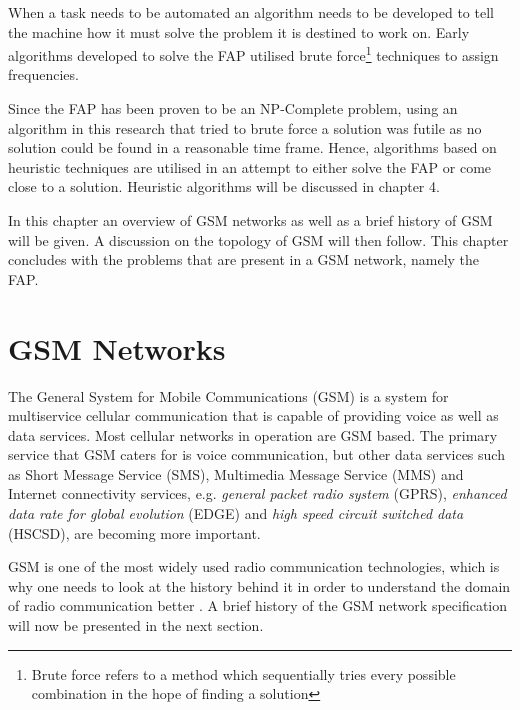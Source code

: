 When a task needs to be automated an algorithm needs to be developed to tell the machine how it must solve the problem it is destined to work on\cite{Karen2004,Eisenblatter,GSMArchitectureProtocolsServices,GSM92,wirelesstelcoMullet}. Early algorithms developed to solve the FAP utilised brute force\footnote{Brute force refers to a method which sequentially tries every possible combination in the hope of finding a solution} techniques to assign frequencies\cite{Karen2004,Eisenblatter,GSMArchitectureProtocolsServices,GSM92,wirelesstelcoMullet}.

Since the FAP has been proven to be an NP-Complete problem, using an algorithm in this research that tried to brute force a solution was futile as no solution could be found in a reasonable time frame. Hence, algorithms based on heuristic techniques are utilised in an attempt to either solve the FAP or come close to a solution. Heuristic algorithms will be discussed in chapter 4.

In this chapter an overview of GSM networks as well as a brief history of GSM will be given. A discussion on the topology of GSM will then follow. This chapter concludes with the problems that are present in a GSM network, namely the FAP.

\section{GSM Networks}
The General System for Mobile Communications (GSM) is a system for multiservice cellular communication that is capable of providing voice as well as data services\cite{Karen2004,Eisenblatter,GSMArchitectureProtocolsServices,GSM92,wirelesstelcoMullet}. Most cellular networks in operation are GSM based\cite{Karen2004,Eisenblatter,GSMArchitectureProtocolsServices,GSM92,wirelesstelcoMullet}. The primary service that GSM caters for is voice communication, but other data services such as Short Message Service (SMS), Multimedia Message Service (MMS) and Internet connectivity services, e.g. \emph{general packet radio system} (GPRS), \emph{enhanced data rate for global evolution} (EDGE) and \emph{high speed circuit switched data} (HSCSD), are becoming more important\cite{GSMArchitectureProtocolsServices,Eisenblatter}.

GSM is one of the most widely used radio communication technologies, which is why one needs to look at the history behind it in order to understand the domain of radio communication better \cite{GSMArchitectureProtocolsServices}. A brief history of the GSM network specification will now be presented in the next section.

